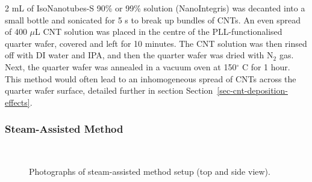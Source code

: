 \documentclass[
  a4paper,
]{scrbook}
\begin{document}
2 mL of IsoNanotubes-S 90\% or 99\% solution (NanoIntegris) was decanted
into a small bottle and sonicated for 5 s to break up bundles of CNTs.
An even spread of 400 \(\mu\)L CNT solution was placed in the centre of
the PLL-functionalised quarter wafer, covered and left for 10 minutes.
The CNT solution was then rinsed off with DI water and IPA, and then the
quarter wafer was dried with N\(_2\) gas. Next, the quarter wafer was
annealed in a vacuum oven at 150\(^\circ\) C for 1 hour. This method
would often lead to an inhomogeneous spread of CNTs across the quarter
wafer surface, detailed further in section
Section~\ref{sec-cnt-deposition-effects}.

\hypertarget{steam-assisted-method}{%
\subsubsection*{Steam-Assisted Method}\label{steam-assisted-method}}

\begin{figure}

\begin{minipage}[t]{0.47\linewidth}

{\centering 


}

\end{minipage}%
%
\begin{minipage}[t]{0.05\linewidth}

{\centering 

~

}

\end{minipage}%
%
\begin{minipage}[t]{0.47\linewidth}

{\centering 


}

\end{minipage}%

\caption{\label{fig-steaming-method}Photographs of steam-assisted method
setup (top and side view).}

\end{figure}
\end{document}
